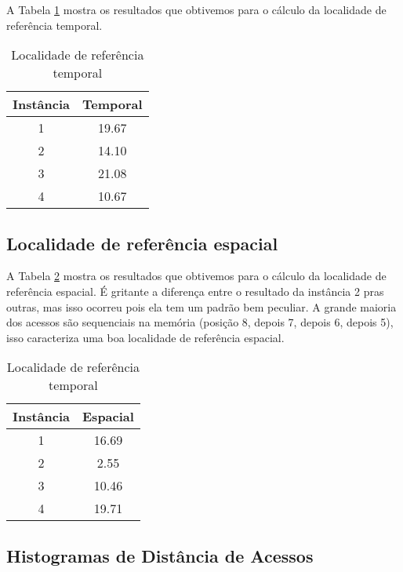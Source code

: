 \documentclass[12pt]{article}
\begin{document}
A Tabela \ref{tab_ref_temp} mostra os resultados que obtivemos para o cálculo da localidade de referência temporal.

\begin{table}[h!]
\centering
\begin{footnotesize}
\begin{tabular}{|c|c|}
\hline
\textbf{Instância}  & \textbf{Temporal}  \\ \hline
1 & 19.67 \\ \hline
2 & 14.10 \\ \hline
3 & 21.08 \\ \hline
4 & 10.67 \\ \hline

\end{tabular}
\end{footnotesize}
\caption{Localidade de referência temporal \label{tab_ref_temp}}
\end{table}


\subsection{Localidade de referência espacial}
\label{loc_ref_esp}

A Tabela \ref{tab_ref_esp} mostra os resultados que obtivemos para o cálculo da localidade de referência espacial. É gritante a diferença entre o resultado da instância 2 pras outras, mas isso ocorreu pois ela tem um padrão bem peculiar. A grande maioria dos acessos são sequenciais na memória (posição 8, depois 7, depois 6, depois 5), isso caracteriza uma boa localidade de referência espacial.


\begin{table}[h!]
\centering
\begin{footnotesize}
\begin{tabular}{|c|c|}
\hline
\textbf{Instância}  & \textbf{Espacial}  \\ \hline
1 &  16.69\\ \hline
2 & 2.55\\ \hline
3 &  10.46\\ \hline
4 &  19.71\\ \hline

\end{tabular}
\end{footnotesize}
\caption{Localidade de referência temporal \label{tab_ref_esp}}
\end{table}


\subsection{Histogramas de Distância de Acessos}
\label{hist_dist_acess}
\end{document}
